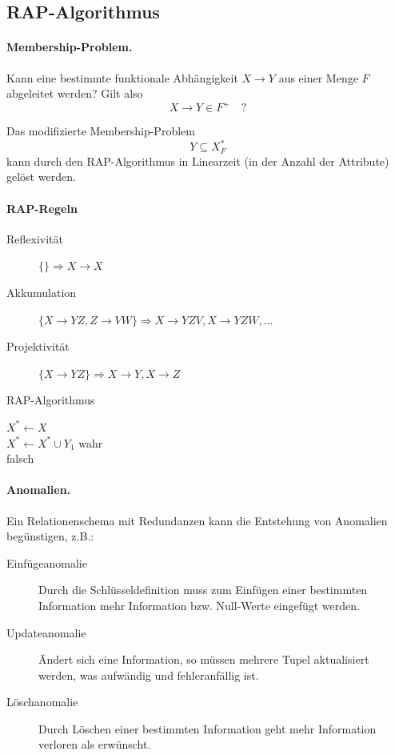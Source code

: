\documentclass[]{scrartcl}
\begin{document}
\subsection{RAP-Algorithmus}

\paragraph{Membership-Problem.} Kann eine bestimmte funktionale Abh\"angigkeit $X \to Y$ aus einer Menge $F$ abgeleitet werden? Gilt also
$$ X \to Y \in F^+ \quad ?$$

Das modifizierte Membership-Problem
$$ Y \subseteq X_{F}^*$$
kann durch den RAP-Algorithmus in Linearzeit (in der Anzahl der Attribute) gel\"ost werden.

\paragraph{RAP-Regeln}
\begin{description}
\item[Reflexivit\"at] $\{ \} \Rightarrow X \to X$ 
\item[Akkumulation] $\{ X \to YZ, Z \to VW \} \Rightarrow X \to YZV, X \to YZW, \dots$
\item[Projektivit\"at] $\{ X \to YZ \} \Rightarrow X \to Y, X \to Z$
\end{description}



\begin{algorithm}[H]
\caption{RAP-Algorithmus}

$X^* \gets X$ \\
 {
 {
	$X^* \gets X^* \cup Y_{1}$
}
}
 {
	\Return wahr \\
}{
	\Return falsch \\
}
\end{algorithm}


\paragraph{Anomalien.} Ein Relationenschema mit Redundanzen kann die Entstehung von Anomalien beg\"unstigen, z.B.:
\begin{description}
\item[Einf\"ugeanomalie] Durch die Schl\"usseldefinition muss zum Einf\"ugen einer bestimmten Information mehr Information bzw. Null-Werte eingef\"ugt werden.
\item[Updateanomalie] \"Andert sich eine Information, so m\"ussen mehrere Tupel aktualisiert werden, was aufw\"andig und fehleranf\"allig ist.
\item[L\"oschanomalie] Durch L\"oschen einer bestimmten Information geht mehr Information verloren als erw\"unscht.
\end{description}
\end{document}
